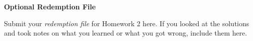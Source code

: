 \documentclass{article}\usepackage[utf8]{inputenc}
\begin{document}
\EndSolution
\clearpage

\vspace{-2mm}\noindent\begin{mybox}{\begin{center}\textbf{\color{black}Optional Redemption File}\end{center}}\end{mybox}\vspace{2mm}

\noindent Submit your \textit{redemption file} for Homework 2 here. If you looked at the solutions and took notes on what you learned or what you got wrong, include them here.
\end{document}
